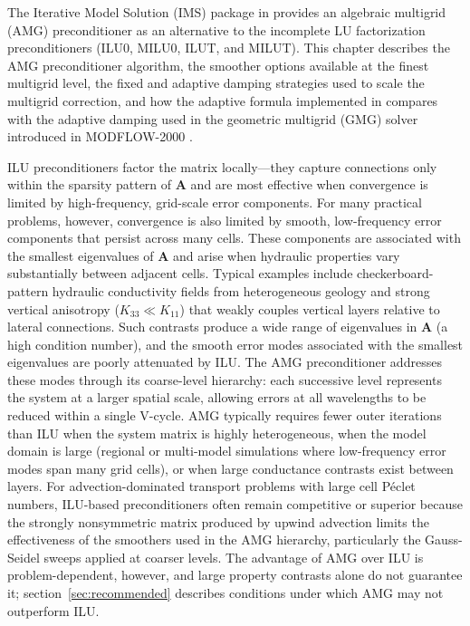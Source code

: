 The Iterative Model Solution (IMS) package in \mf provides an algebraic multigrid (AMG) preconditioner \citep{rugestuben1987,stuben2001} as an alternative to the incomplete LU factorization preconditioners (ILU0, MILU0, ILUT, and MILUT). This chapter describes the AMG preconditioner algorithm, the smoother options available at the finest multigrid level, the fixed and adaptive damping strategies used to scale the multigrid correction, and how the adaptive formula implemented in \mf compares with the adaptive damping used in the geometric multigrid (GMG) solver introduced in MODFLOW-2000 \citep{wilsonnaff2004}.

ILU preconditioners factor the matrix locally---they capture connections only within the sparsity pattern of $\mathbf{A}$ and are most effective when convergence is limited by high-frequency, grid-scale error components. For many practical \mf problems, however, convergence is also limited by smooth, low-frequency error components that persist across many cells. These components are associated with the smallest eigenvalues of $\mathbf{A}$ and arise when hydraulic properties vary substantially between adjacent cells. Typical examples include checkerboard-pattern hydraulic conductivity fields from heterogeneous geology and strong vertical anisotropy ($K_{33} \ll K_{11}$) that weakly couples vertical layers relative to lateral connections. Such contrasts produce a wide range of eigenvalues in $\mathbf{A}$ (a high condition number), and the smooth error modes associated with the smallest eigenvalues are poorly attenuated by ILU. The AMG preconditioner addresses these modes through its coarse-level hierarchy: each successive level represents the system at a larger spatial scale, allowing errors at all wavelengths to be reduced within a single V-cycle. AMG typically requires fewer outer iterations than ILU when the system matrix is highly heterogeneous, when the model domain is large (regional or multi-model simulations where low-frequency error modes span many grid cells), or when large conductance contrasts exist between layers. For advection-dominated transport problems with large cell P\'{e}clet numbers, ILU-based preconditioners often remain competitive or superior because the strongly nonsymmetric matrix produced by upwind advection limits the effectiveness of the smoothers used in the AMG hierarchy, particularly the Gauss-Seidel sweeps applied at coarser levels. The advantage of AMG over ILU is problem-dependent, however, and large property contrasts alone do not guarantee it; section~\ref{sec:recommended} describes conditions under which AMG may not outperform ILU.

